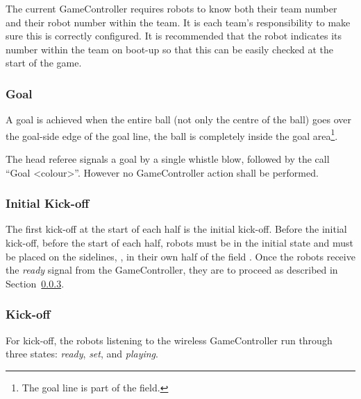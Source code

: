 The current GameController requires robots to know both their team number and their robot number within the team. It is each team's responsibility to make sure this is correctly configured. It is recommended that the robot indicates its number within the team on boot-up so that this can be easily checked at the start of the game.

\subsubsection{Goal}
\label{sec:goal}
A goal  is achieved when the entire ball (not only the centre of the ball) goes over the goal-side edge of the goal line, \ie the ball is completely inside the goal area\footnote{The goal line is part of the field.}.


The head referee signals a goal by a single whistle blow, followed by the call ``Goal \textless colour\textgreater''. However no GameController action shall be performed.



\subsubsection{Initial Kick-off}
\label{sec:initial-kick-off}

The first kick-off at the start of each half is the initial kick-off.
Before the initial kick-off, \ie before the start of each half,  robots must be in the initial state and must be placed on the sidelines, , in their own half of the field . 
Once the robots receive the \emph{ready} signal from the GameController, they are to proceed as described in Section~\ref{sec:kick-off}.

\subsubsection{Kick-off}
\label{sec:kick-off}
For kick-off, the robots listening to the wireless GameController run through three states: \emph{ready}, \emph{set}, and \emph{playing}. 

